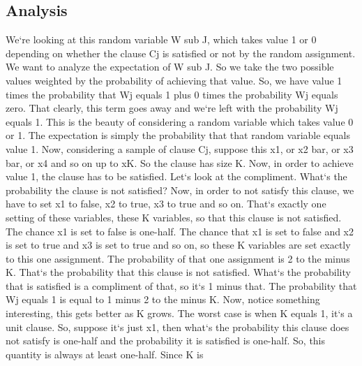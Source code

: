 \subsection{Analysis}
We`re looking at this random variable W sub J, which takes value 1 or 0 depending on whether the clause Cj is satisfied or not by the random assignment.
We want to analyze the expectation of W sub J\@.
So we take the two possible values weighted by the probability of achieving that value.
So, we have value 1 times the probability that Wj equals 1 plus 0 times the probability Wj equals zero.
That clearly, this term goes away and we`re left with the probability Wj equals 1.
This is the beauty of considering a random variable which takes value 0 or 1.
The expectation is simply the probability that that random variable equals value 1.
Now, considering a sample of clause Cj, suppose this x1, or x2 bar, or x3 bar, or x4 and so on up to xK\@.
So the clause has size K\@.
Now, in order to achieve value 1, the clause has to be satisfied.
Let`s look at the compliment.
What`s the probability the clause is not satisfied? Now, in order to not satisfy this clause, we have to set x1 to false, x2 to true, x3 to true and so on.
That`s exactly one setting of these variables, these K variables, so that this clause is not satisfied.
The chance x1 is set to false is one-half.
The chance that x1 is set to false and x2 is set to true and x3 is set to true and so on, so these K variables are set exactly to this one assignment.
The probability of that one assignment is 2 to the minus K\@.
That`s the probability that this clause is not satisfied.
What`s the probability that is satisfied is a compliment of that, so it`s 1 minus that.
The probability that Wj equals 1 is equal to 1 minus 2 to the minus K\@.
Now, notice something interesting, this gets better as K grows.
The worst case is when K equals 1, it`s a unit clause.
So, suppose it`s just x1, then what`s the probability this clause does not satisfy is one-half and the probability it is satisfied is one-half.
So, this quantity is always at least one-half.
Since K is

